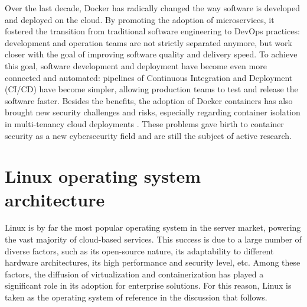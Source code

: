 Over the last decade, Docker has radically changed the way software is developed and deployed on the cloud. By promoting the adoption of microservices, it fostered the transition from traditional software engineering to DevOps practices: development and operation teams are not strictly separated anymore, but work closer with the goal of improving software quality and delivery speed.
To achieve this goal, software development and deployment have become even more connected and automated: pipelines of Continuous Integration and Deployment (CI/CD) have become simpler, allowing production teams to test and release the software faster. 
Besides the benefits, the adoption of Docker containers has also brought new security challenges and risks, especially regarding container isolation in multi-tenancy cloud deployments \cite{luo2016whispers,gao2018study}.
These problems gave birth to container security as a new cybersecurity field and are still the subject of active research.

\section{Linux operating system architecture}
Linux is by far the most popular operating system in the server market, powering the vast majority of cloud-based services. This success is due to a large number of diverse factors, such as its open-source nature, its adaptability to different hardware architectures, its high performance and security level, etc. Among these factors, the diffusion of virtualization and containerization has played a significant role in its adoption for enterprise solutions. For this reason, Linux is taken as the operating system of reference in the discussion that follows.

